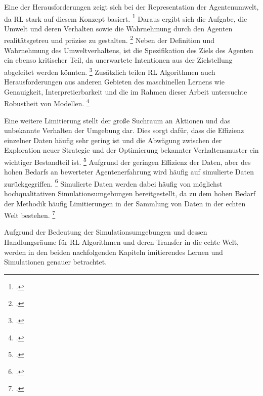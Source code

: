 Eine der Herausforderungen zeigt sich bei der Representation der Agentenumwelt, da RL stark auf diesem Konzept basiert. \footcite[Vgl.][S. 8]{Sutton.2018}
Daraus ergibt sich die Aufgabe, die Umwelt und deren Verhalten sowie die Wahrnehmung durch den Agenten realitätsgetreu und präzise zu gestalten. \footcite[Vgl.][S. 7]{Sutton.2018}
Neben der Definition und Wahrnehmung des Umweltverhaltens, ist die Spezifikation des Ziels des Agenten ein ebenso kritischer Teil, da unerwartete Intentionen aus der Zielstellung abgeleitet werden könnten. \footcite[Vgl.][S. 7]{Li.2019}
Zusätzlich teilen RL Algorithmen auch Herausforderungen aus anderen Gebieten des maschinellen Lernens wie Genauigkeit, Interpretierbarkeit und die im Rahmen dieser Arbeit untersuchte Robustheit von Modellen. \footcite[Vgl.][S. 7]{Li.2019}

Eine weitere Limitierung stellt der große Suchraum an Aktionen und das unbekannte Verhalten der Umgebung dar.
Dies sorgt dafür, dass die Effizienz einzelner Daten häufig sehr gering ist und die Abwägung zwischen der Exploration neuer Strategie und der Optimierung bekannter Verhaltensmuster ein wichtiger Bestandteil ist. \footcite[Vgl.][S. 7]{Li.2019}
Aufgrund der geringen Effizienz der Daten, aber des hohen Bedarfs an bewerteter Agentenerfahrung wird häufig auf simulierte Daten zurückgegriffen. \footcite[Vgl.][S. 7]{Zhao.2020}
Simulierte Daten werden dabei häufig von möglichst hochqualitativen Simulationsumgebungen bereitgestellt, da zu dem hohen Bedarf der Methodik häufig Limitierungen in der Sammlung von Daten in der echten Welt bestehen. \footcite[Vgl.][S. 8]{Li.2019}

Aufgrund der Bedeutung der Simulationsumgebungen und dessen Handlungsräume für RL Algorithmen und deren Transfer in die echte Welt, werden in den beiden nachfolgenden Kapiteln imitierendes Lernen und Simulationen genauer betrachtet.
